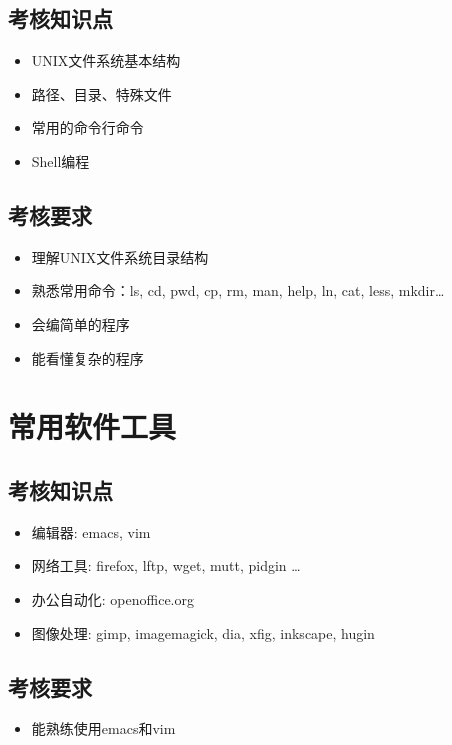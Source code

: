 \documentclass[12pt,a4paper]{article}
\begin{document}
\subsection{考核知识点}

\begin{itemize}
\item UNIX文件系统基本结构
\item 路径、目录、特殊文件
\item 常用的命令行命令
\item Shell编程
\end{itemize}

\subsection{考核要求}

\begin{itemize}
\item 理解UNIX文件系统目录结构
\item 熟悉常用命令：ls, cd, pwd, cp, rm, man, help, ln, cat, less, mkdir\ldots{}
\item 会编简单的程序
\item 能看懂复杂的程序
\end{itemize}

\section{常用软件工具}

\subsection{考核知识点}

\begin{itemize}
\item 编辑器: emacs, vim
\item 网络工具: firefox, lftp, wget, mutt, pidgin \ldots{}
\item 办公自动化: openoffice.org
\item 图像处理: gimp, imagemagick, dia, xfig, inkscape, hugin
\end{itemize}

\subsection{考核要求}

\begin{itemize}
\item 能熟练使用emacs和vim
\end{itemize}
\end{document}

